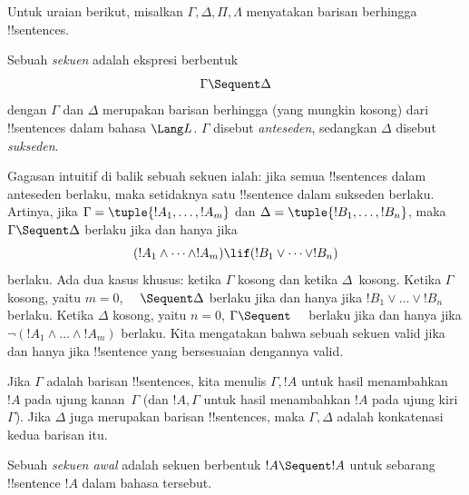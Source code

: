 \documentclass[../../../include/open-logic-section]{subfiles}
\begin{document}
      {}
      {}


Untuk uraian berikut, misalkan $\Gamma, \Delta, \Pi, \Lambda$ menyatakan
barisan berhingga !!{sentence}s.

\begin{defn}[Sekuen]
Sebuah \emph{sekuen} adalah ekspresi berbentuk
\[
\Gamma \Sequent \Delta
\]
dengan $\Gamma$ dan $\Delta$ merupakan barisan berhingga (yang mungkin
kosong) dari !!{sentence}s dalam bahasa $\Lang L$. $\Gamma$ disebut
\emph{anteseden}, sedangkan $\Delta$ disebut \emph{sukseden}.
\end{defn}

\begin{explain}
Gagasan intuitif di balik sebuah sekuen ialah: jika semua !!{sentence}s
dalam anteseden berlaku, maka setidaknya satu !!{sentence} dalam sukseden
berlaku. Artinya, jika $\Gamma = \tuple{!A_1, \dots, !A_m}$ dan
$\Delta = \tuple{!B_1, \dots, !B_n}$, maka $\Gamma \Sequent \Delta$
berlaku jika dan hanya jika
\[
(!A_1 \land \cdots \land !A_m) \lif (!B_1 \lor \cdots \lor
!B_n)
\]
berlaku. Ada dua kasus khusus: ketika $\Gamma$ kosong dan ketika
$\Delta$~kosong. Ketika $\Gamma$ kosong, yaitu $m = 0$, $\quad
\Sequent \Delta$ berlaku jika dan hanya jika $!B_1 \lor \dots \lor !B_n$
berlaku. Ketika $\Delta$ kosong, yaitu $n = 0$, $\Gamma \Sequent \quad$
berlaku jika dan hanya jika $\lnot(!A_1 \land \dots \land !A_m)$ berlaku.
Kita mengatakan bahwa sebuah sekuen valid jika dan hanya jika
!!{sentence} yang bersesuaian dengannya valid.
\end{explain}

Jika $\Gamma$ adalah barisan !!{sentence}s, kita menulis $\Gamma, !A$
untuk hasil menambahkan $!A$ pada ujung kanan~$\Gamma$ (dan $!A, \Gamma$
untuk hasil menambahkan $!A$ pada ujung kiri~$\Gamma$). Jika $\Delta$
juga merupakan barisan !!{sentence}s, maka $\Gamma, \Delta$ adalah
konkatenasi kedua barisan itu.

\begin{defn}
Sebuah \emph{sekuen awal} adalah sekuen
{berbentuk $!A \Sequent !A$} untuk sebarang !!{sentence} $!A$ dalam bahasa tersebut.
\end{defn}
\end{document}
